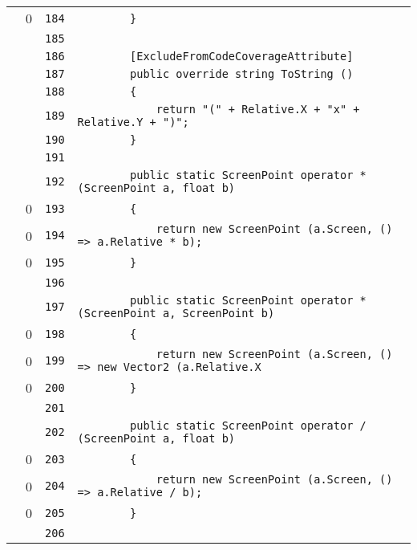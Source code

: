 \documentclass[a4paper,10pt]{article}
\begin{document}
\begin{longtable}[l]{lrrl}
\cellcolor{red} & 0 & \verb~184~ & \verb~        }~\\
\cellcolor{gray} &  & \verb~185~ & \verb~~\\
\cellcolor{gray} &  & \verb~186~ & \verb~        [ExcludeFromCodeCoverageAttribute]~\\
\cellcolor{gray} &  & \verb~187~ & \verb~        public override string ToString ()~\\
\cellcolor{gray} &  & \verb~188~ & \verb~        {~\\
\cellcolor{gray} &  & \verb~189~ & \verb~            return "(" + Relative.X + "x" + Relative.Y + ")";~\\
\cellcolor{gray} &  & \verb~190~ & \verb~        }~\\
\cellcolor{gray} &  & \verb~191~ & \verb~~\\
\cellcolor{gray} &  & \verb~192~ & \verb~        public static ScreenPoint operator * (ScreenPoint a, float b)~\\
\cellcolor{red} & 0 & \verb~193~ & \verb~        {~\\
\cellcolor{red} & 0 & \verb~194~ & \verb~            return new ScreenPoint (a.Screen, () => a.Relative * b);~\\
\cellcolor{red} & 0 & \verb~195~ & \verb~        }~\\
\cellcolor{gray} &  & \verb~196~ & \verb~~\\
\cellcolor{gray} &  & \verb~197~ & \verb~        public static ScreenPoint operator * (ScreenPoint a, ScreenPoint b)~\\
\cellcolor{red} & 0 & \verb~198~ & \verb~        {~\\
\cellcolor{red} & 0 & \verb~199~ & \verb~            return new ScreenPoint (a.Screen, () => new Vector2 (a.Relative.X ~\\
\cellcolor{red} & 0 & \verb~200~ & \verb~        }~\\
\cellcolor{gray} &  & \verb~201~ & \verb~~\\
\cellcolor{gray} &  & \verb~202~ & \verb~        public static ScreenPoint operator / (ScreenPoint a, float b)~\\
\cellcolor{red} & 0 & \verb~203~ & \verb~        {~\\
\cellcolor{red} & 0 & \verb~204~ & \verb~            return new ScreenPoint (a.Screen, () => a.Relative / b);~\\
\cellcolor{red} & 0 & \verb~205~ & \verb~        }~\\
\cellcolor{gray} &  & \verb~206~ & \verb~~\\

\end{longtable}
\end{document}
